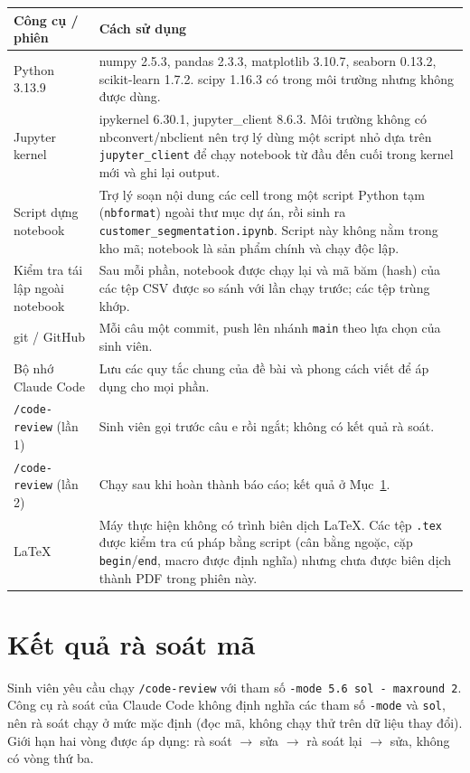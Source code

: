 \documentclass[11pt,a4paper]{article}
\begin{document}
\begin{longtable}{P{0.3\textwidth}P{0.64\textwidth}}
\toprule
\textbf{Công cụ / phiên} & \textbf{Cách sử dụng} \\
\midrule
\endhead
Python 3.13.9 & numpy 2.5.3, pandas 2.3.3, matplotlib 3.10.7, seaborn 0.13.2, scikit-learn 1.7.2. scipy 1.16.3 có trong môi trường nhưng không được dùng. \\
\addlinespace
Jupyter kernel & ipykernel 6.30.1, jupyter\_client 8.6.3. Môi trường không có nbconvert/nbclient nên trợ lý dùng một script nhỏ dựa trên \texttt{jupyter\_client} để chạy notebook từ đầu đến cuối trong kernel mới và ghi lại output. \\
\addlinespace
Script dựng notebook & Trợ lý soạn nội dung các cell trong một script Python tạm (\texttt{nbformat}) ngoài thư mục dự án, rồi sinh ra \texttt{customer\_segmentation.ipynb}. Script này không nằm trong kho mã; notebook là sản phẩm chính và chạy độc lập. \\
\addlinespace
Kiểm tra tái lập ngoài notebook & Sau mỗi phần, notebook được chạy lại và mã băm (hash) của các tệp CSV được so sánh với lần chạy trước; các tệp trùng khớp. \\
\addlinespace
git / GitHub & Mỗi câu một commit, push lên nhánh \texttt{main} theo lựa chọn của sinh viên. \\
\addlinespace
Bộ nhớ Claude Code & Lưu các quy tắc chung của đề bài và phong cách viết để áp dụng cho mọi phần. \\
\addlinespace
\texttt{/code-review} (lần 1) & Sinh viên gọi trước câu e rồi ngắt; không có kết quả rà soát. \\
\addlinespace
\texttt{/code-review} (lần 2) & Chạy sau khi hoàn thành báo cáo; kết quả ở Mục~\ref{sec:review}. \\
\addlinespace
LaTeX & Máy thực hiện không có trình biên dịch LaTeX. Các tệp \texttt{.tex} được kiểm tra cú pháp bằng script (cân bằng ngoặc, cặp \texttt{begin}/\texttt{end}, macro được định nghĩa) nhưng chưa được biên dịch thành PDF trong phiên này. \\
\bottomrule
\end{longtable}

\section{Kết quả rà soát mã}
\label{sec:review}

Sinh viên yêu cầu chạy \texttt{/code-review} với tham số \texttt{-mode 5.6 sol - maxround 2}. Công cụ rà soát của Claude Code không định nghĩa các tham số \texttt{-mode} và \texttt{sol}, nên rà soát chạy ở mức mặc định (đọc mã, không chạy thử trên dữ liệu thay đổi). Giới hạn hai vòng được áp dụng: rà soát $\rightarrow$ sửa $\rightarrow$ rà soát lại $\rightarrow$ sửa, không có vòng thứ ba.
\end{document}

